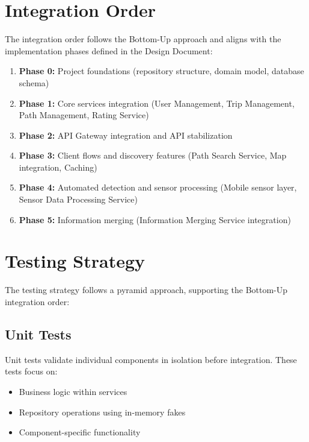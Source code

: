 \section{Integration Order}
\label{sec:integration_order}%

The integration order follows the Bottom-Up approach and aligns with the implementation phases defined in the Design Document:

\begin{enumerate}
    \item \textbf{Phase 0:} Project foundations (repository structure, domain model, database schema)
    \item \textbf{Phase 1:} Core services integration (User Management, Trip Management, Path Management, Rating Service)
    \item \textbf{Phase 2:} API Gateway integration and API stabilization
    \item \textbf{Phase 3:} Client flows and discovery features (Path Search Service, Map integration, Caching)
    \item \textbf{Phase 4:} Automated detection and sensor processing (Mobile sensor layer, Sensor Data Processing Service)
    \item \textbf{Phase 5:} Information merging (Information Merging Service integration)
\end{enumerate}

\section{Testing Strategy}
\label{sec:testing_strategy}%

The testing strategy follows a pyramid approach, supporting the Bottom-Up integration order:

\subsection{Unit Tests}
\label{subsec:unit_tests}%
Unit tests validate individual components in isolation before integration. These tests focus on:
\begin{itemize}
    \item Business logic within services
    \item Repository operations using in-memory fakes
    \item Component-specific functionality
\end{itemize}

